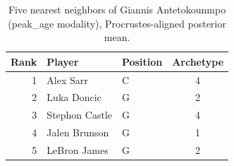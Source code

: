 \begin{table}[htbp]
  \centering\small
  \begin{tabular}{rllc}
    \toprule
    Rank & Player & Position & Archetype \\
    \midrule
    1 & Alex Sarr & C & 4 \\
    2 & Luka Doncic & G & 2 \\
    3 & Stephon Castle & G & 4 \\
    4 & Jalen Brunson & G & 1 \\
    5 & LeBron James & G & 2 \\
    \bottomrule
  \end{tabular}
  \caption{Five nearest neighbors of Giannis Antetokounmpo (peak_age modality), Procrustes-aligned posterior mean.}
  \label{tab:Giannis_Antetokounmpo_neighbors_peak_age}
\end{table}

